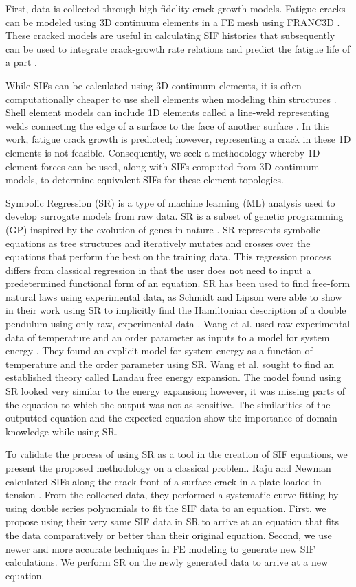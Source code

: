 First, data is collected through high fidelity crack growth models. Fatigue cracks can be modeled using 3D continuum elements in a FE mesh using FRANC3D \cite{carter2000automated}. These cracked models are useful in calculating SIF histories that subsequently can be used to integrate crack-growth rate relations and predict the fatigue life of a part \cite{sankararaman2009uncertainty}. 

While SIFs can be calculated using 3D continuum elements, it is often computationally cheaper to use shell elements when modeling thin structures \cite{bathe2006finite}. Shell element models can include 1D elements called a line-weld representing welds connecting the edge of a surface to the face of another surface \cite{osti_1433781}. In this work, fatigue crack growth is predicted; however, representing a crack in these 1D elements is not feasible.  Consequently, we seek a methodology whereby 1D element forces can be used, along with SIFs computed from 3D continuum models, to determine equivalent SIFs for these element topologies. 

Symbolic Regression (SR) is a type of machine learning (ML) analysis used to develop surrogate models from raw data. SR is a subset of genetic programming (GP) inspired by the evolution of genes in nature \cite{banzhaf1998genetic}. SR represents symbolic equations as tree structures and iteratively mutates and crosses over the equations that perform the best on the training data. This regression process differs from classical regression in that the user does not need to input a predetermined functional form of an equation. SR has been used to find free-form natural laws using experimental data, as Schmidt and Lipson were able to show in their work using SR to implicitly find the Hamiltonian description of a double pendulum using only raw, experimental data \cite{schmidt2009distilling}. Wang et al. used raw experimental data of temperature and an order parameter as inputs to a model for system energy \cite{wang2019symbolic}. They found an explicit model for system energy as a function of temperature and the order parameter using SR. Wang et al. sought to find an established theory called Landau free energy expansion. The model found using SR looked very similar to the energy expansion; however, it was missing parts of the equation to which the output was not as sensitive. The similarities of the outputted equation and the expected equation show the importance of domain knowledge while using SR.

To validate the process of using SR as a tool in the creation of SIF equations, we present the proposed methodology on a classical problem. Raju and Newman calculated SIFs along the crack front of a surface crack in a plate loaded in tension \cite{raju1979stress}. From the collected data, they performed a systematic curve fitting by using double series polynomials \cite{newman1983stress} to fit the SIF data to an equation. First, we propose using their very same SIF data in SR to arrive at an equation that fits the data comparatively or better than their original equation. Second, we use newer and more accurate techniques in FE modeling to generate new SIF calculations. We perform SR on the newly generated data to arrive at a new equation.

